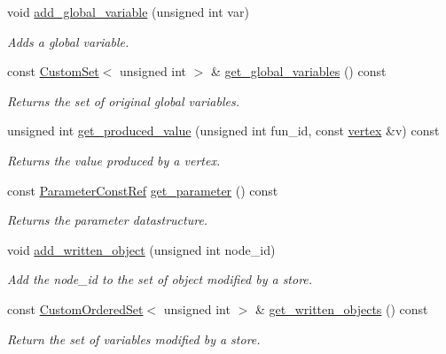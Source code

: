 \begin{DoxyCompactItemize}
void \hyperlink{classapplication__manager_a953bb946a20470c15bb25dc6fa820686}{add\+\_\+global\+\_\+variable} (unsigned int var)
\begin{DoxyCompactList}\small\item\em Adds a global variable. \end{DoxyCompactList}\item 
const \hyperlink{custom__set_8hpp_a615bc2f42fc38a4bb1790d12c759e86f}{Custom\+Set}$<$ unsigned int $>$ \& \hyperlink{classapplication__manager_a68b9ede8165189c2030c568815b66309}{get\+\_\+global\+\_\+variables} () const
\begin{DoxyCompactList}\small\item\em Returns the set of original global variables. \end{DoxyCompactList}\item 
unsigned int \hyperlink{classapplication__manager_ac4bb15c84ffb2500a40746e74b9f238c}{get\+\_\+produced\+\_\+value} (unsigned int fun\+\_\+id, const \hyperlink{graph_8hpp_abefdcf0544e601805af44eca032cca14}{vertex} \&v) const
\begin{DoxyCompactList}\small\item\em Returns the value produced by a vertex. \end{DoxyCompactList}\item 
const \hyperlink{Parameter_8hpp_a37841774a6fcb479b597fdf8955eb4ea}{Parameter\+Const\+Ref} \hyperlink{classapplication__manager_aeaaeb0ced85cc92fe68d047a4edcff19}{get\+\_\+parameter} () const
\begin{DoxyCompactList}\small\item\em Returns the parameter datastructure. \end{DoxyCompactList}\item 
void \hyperlink{classapplication__manager_a917d132d540b5fb71a236dbb8f1c6a31}{add\+\_\+written\+\_\+object} (unsigned int node\+\_\+id)
\begin{DoxyCompactList}\small\item\em Add the node\+\_\+id to the set of object modified by a store. \end{DoxyCompactList}\item 
const \hyperlink{classCustomOrderedSet}{Custom\+Ordered\+Set}$<$ unsigned int $>$ \& \hyperlink{classapplication__manager_a4990ab2af03c641da7b8dad08706208c}{get\+\_\+written\+\_\+objects} () const
\begin{DoxyCompactList}\small\item\em Return the set of variables modified by a store. \end{DoxyCompactList}\item 

\end{DoxyCompactItemize}

